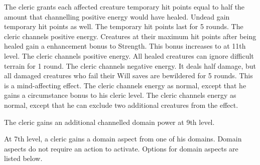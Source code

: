  The cleric grants each affected creature temporary hit points equal to half the amount that channelling positive energy would have healed. Undead gain temporary hit points as well. The temporary hit points last for 5 rounds.
 The cleric channels positive energy. Creatures at their maximum hit points after being healed gain a  enhancement bonus to Strength. This bonus increases to  at 11th level.
 The cleric channels positive energy. All healed creatures can ignore difficult terrain for 1 round.
 The cleric channels negative energy. It deals half damage, but all damaged creatures who fail their Will saves are bewildered for 5 rounds. This is a mind-affecting effect.
 The cleric channels energy as normal, except that he gains a  circumstance bonus to his cleric level.
 The cleric channels energy as normal, except that he can exclude two additional creatures from the effect.

\par The cleric gains an additional channelled domain power at 9th level.

 At 7th level, a cleric gains a domain aspect from one of his domains. Domain aspects do not require an action to activate. Options for domain aspects are listed below.

